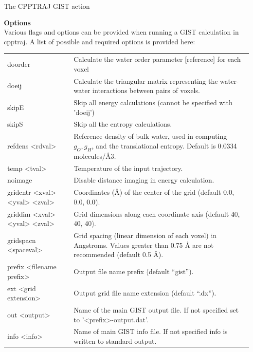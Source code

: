 \documentclass[9pt,tutorial]{livecoms}
\begin{document}
\begin{Checklists*}

\begin{checklist}{The CPPTRAJ GIST action}\label{cheatsheet}

\textbf{Options}\\
Various flags and options can be provided when running a GIST calculation in 
cpptraj. A list of possible and required options is provided here:

\begin{tabular}{@{}l p{}@{}}
\toprule
doorder & Calculate the water order parameter [reference] for each voxel\\
doeij & Calculate the triangular matrix representing the water-water 
interactions between pairs of voxels.\\
skipE & Skip all energy calculations (cannot be specified with ’doeij’)\\
skipS & Skip all the entropy calculations.\\
refdens <rdval> & Reference density of bulk water, used in computing 
$g_O, g_H$, and the translational entropy. Default is 0.0334 molecules/Å3. \\
temp <tval> & Temperature of the input trajectory. \\
noimage &  Disable distance imaging in energy calculation. \\
gridcntr <xval> <yval> <zval> & Coordinates (Å) of the center of the grid 
(default 0.0, 0.0, 0.0). \\
griddim <xval> <yval> <zval> & Grid dimensions along each coordinate axis 
(default 40, 40, 40).\\
gridspacn <spaceval> & Grid spacing (linear dimension of each voxel) in 
Angstroms. Values greater than 0.75 Å are not recommended (default 0.5 Å).\\
prefix <filename prefix> & Output file name prefix (default “gist”).\\
ext <grid extension> & Output grid file name extension (default “.dx”). \\
out <output> & Name of the main GIST output file. If not specified set to 
’<prefix>-output.dat’.\\
info <info> & Name of main GIST info file. If not specified info is 
written to standard output. \\
\bottomrule
\end{tabular}



\end{checklist}
\end{Checklists*}
\end{document}

